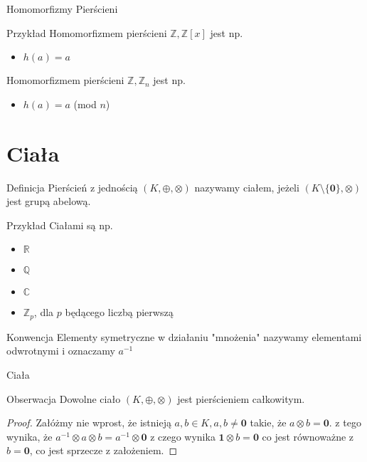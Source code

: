 \documentclass{beamer}
\newcommand{\zero}{\mathbf{0}}
\newcommand{\one}{\mathbf{1}}
\begin{document}
\begin{frame}{Homomorfizmy Pierścieni}
    \begin{exampleblock}{Przykład}
        Homomorfizmem pierścieni $\mathbb{Z}, \mathbb{Z}[x]$ jest np.
        \begin{itemize}
            \item $h(a) = a$
        \end{itemize}
        Homomorfizmem pierścieni $\mathbb{Z}, \mathbb{Z}_n$ jest np.
        \begin{itemize}
            \item $h(a) = a $ (mod $n$)
        \end{itemize}
    \end{exampleblock}
\end{frame}

\section{Ciała}

\begin{frame}
    \begin{block}{Definicja}
        Pierścień z jednością $(K, \oplus, \otimes)$ nazywamy ciałem, jeżeli $(K\setminus \{\zero\}, \otimes)$ jest grupą abelową.
    \end{block}
    \begin{exampleblock}{Przykład}
        Ciałami są np.
        \begin{itemize}
            \item $\mathbb{R}$
            \item $\mathbb{Q}$
            \item $\mathbb{C}$
            \item $\mathbb{Z}_p$, dla $p$ będącego liczbą pierwszą
        \end{itemize}
    \end{exampleblock}
    \begin{alertblock}{Konwencja}
        Elementy symetryczne w działaniu "mnożenia" nazywamy elementami odwrotnymi i oznaczamy $a^{-1}$
    \end{alertblock}
\end{frame}

\begin{frame}{Ciała}
    \begin{block}{Obserwacja}
        Dowolne ciało $(K, \oplus, \otimes)$ jest pierścieniem całkowitym.
    \end{block}
    \pause 
    \begin{proof}
        Załóżmy nie wprost, że istnieją $ a,b \in K, a,b \neq \mathbf{0 }$ takie, że $ a \otimes b = \zero $. z tego wynika, że
        $a^{-1} \otimes a \otimes b = a^{-1} \otimes \zero $ z czego wynika $ \one \otimes b = \zero $ co jest równoważne z $b = \zero$, co jest sprzecze z założeniem.    
    \end{proof}
\end{frame}
\end{document}
